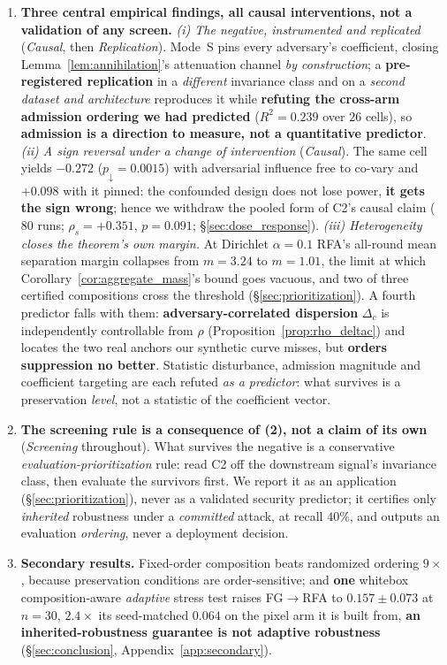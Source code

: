 \documentclass{article}
\begin{document}
\begin{enumerate}[leftmargin=*,itemsep=2pt]
\item \textbf{Three central empirical findings, all causal interventions, not a validation of any screen.} \emph{(i) The negative, instrumented and replicated} (\emph{Causal}, then \emph{Replication}). Mode~S pins every adversary's coefficient, closing Lemma~\ref{lem:annihilation}'s attenuation channel \emph{by construction}; a \textbf{pre-registered replication} in a \emph{different} invariance class and on a \emph{second dataset and architecture} reproduces it while \textbf{refuting the cross-arm admission ordering we had predicted} ($R^2{=}0.239$ over $26$ cells), so \textbf{admission is a direction to measure, not a quantitative predictor}. \emph{(ii) A sign reversal under a change of intervention} (\emph{Causal}). The same cell yields $-0.272$ ($p_{\downarrow}{=}0.0015$) with adversarial influence free to co-vary and $+0.098$ with it pinned: the confounded design does not lose power, \textbf{it gets the sign wrong}; hence we withdraw the pooled form of C2's causal claim ($80$ runs; $\rho_s = +0.351$, $p = 0.091$; \S\ref{sec:dose_response}). \emph{(iii) Heterogeneity closes the theorem's own margin.} At Dirichlet $\alpha{=}0.1$ RFA's all-round mean separation margin collapses from $m{=}3.24$ to $m{=}1.01$, the limit at which Corollary~\ref{cor:aggregate_mass}'s bound goes vacuous, and two of three certified compositions cross the threshold (\S\ref{sec:prioritization}). A fourth predictor falls with them: \textbf{adversary-correlated dispersion} $\Delta_c$ is independently controllable from $\rho$ (Proposition~\ref{prop:rho_deltac}) and locates the two real anchors our synthetic curve misses, but \textbf{orders suppression no better}. Statistic disturbance, admission magnitude and coefficient targeting are each refuted \emph{as a predictor}: what survives is a preservation \emph{level}, not a statistic of the coefficient vector.

\item \textbf{The screening rule is a consequence of (2), not a claim of its own} (\emph{Screening} throughout). What survives the negative is a conservative \emph{evaluation-prioritization} rule: read C2 off the downstream signal's invariance class, then evaluate the survivors first. We report it as an application (\S\ref{sec:prioritization}), never as a validated security predictor; it certifies only \emph{inherited} robustness under a \emph{committed} attack, at recall $40\%$, and outputs an evaluation \emph{ordering}, never a deployment decision.

\item \textbf{Secondary results.} Fixed-order composition beats randomized ordering $9\times$, because preservation conditions are order-sensitive; and \textbf{one} whitebox composition-aware \emph{adaptive} stress test raises FG$\to$RFA to $0.157 \pm 0.073$ at $n{=}30$, $2.4\times$ its seed-matched $0.064$ on the pixel arm it is built from, \textbf{an inherited-robustness guarantee is not adaptive robustness} (\S\ref{sec:conclusion}, Appendix~\ref{app:secondary}).
\end{enumerate}
\end{document}

